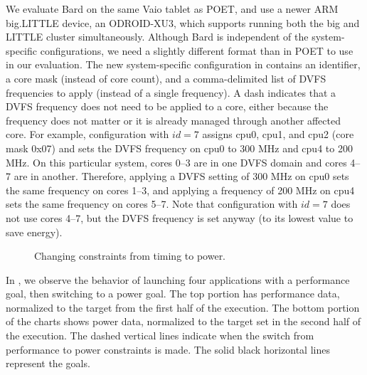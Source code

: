 We evaluate Bard on the same Vaio tablet as POET, and use a newer ARM big.LITTLE device, an ODROID-XU3, which supports running both the big and LITTLE cluster simultaneously.
Although Bard is independent of the system-specific configurations, we need a slightly different format than in POET to use in our evaluation.
The new system-specific configuration in  contains an identifier, a core mask (instead of core count), and a comma-delimited list of DVFS frequencies to apply (instead of a single frequency).
A dash indicates that a DVFS frequency does not need to be applied to a core, either because the frequency does not matter or it is already managed through another affected core.
For example, configuration with $id=7$ assigns cpu0, cpu1, and cpu2 (core mask 0x07) and sets the DVFS frequency on cpu0 to 300 MHz and cpu4 to 200 MHz.
On this particular system, cores 0--3 are in one DVFS domain and cores 4--7 are in another.
Therefore, applying a DVFS setting of 300 MHz on cpu0 sets the same frequency on cores 1--3, and applying a frequency of 200 MHz on cpu4 sets the same frequency on cores 5--7.
Note that configuration with $id=7$ does not use cores 4--7, but the DVFS frequency is set anyway (to its lowest value to save energy).

\begin{figure}[t]
  \centering
    
  \caption{Changing constraints from timing to power.}
  \label{fig:bard-perf-pwr-change-pick4}
\end{figure}

In , we observe the behavior of launching four applications with a performance goal, then switching to a power goal.
The top portion has performance data, normalized to the target from the first half of the execution.
The bottom portion of the charts shows power data, normalized to the target set in the second half of the execution.
The dashed vertical lines indicate when the switch from performance to power constraints is made.
The solid black horizontal lines represent the goals.

